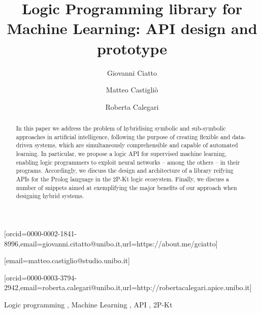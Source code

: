 \documentclass[
]{ceurart}
\begin{document}


\title{%
    Logic Programming library for Machine Learning: API design and prototype
}

\author[1]{Giovanni Ciatto}[orcid=0000-0002-1841-8996,email=giovanni.citatto@unibo.it,url=https://about.me/gciatto]
\author[3]{Matteo Castigliò}[email=matteo.castiglio@studio.unibo.it]
\author[2]{Roberta Calegari}[orcid=0000-0003-3794-2942,email=roberta.calegari@unibo.it,url=http://robertacalegari.apice.unibo.it]

\address[1]{Departement of Computer Science and Engineering (DISI), Alma Mater Studiorum---Università di Bologna}
\address[2]{Alma Mater Research Institute for Human Centered AI (AlmaAI), Alma Mater Studiorum---Università di Bologna}
\address[3]{Master Student at DISI}


\begin{abstract}
In this paper we address the problem of hybridising symbolic and sub-symbolic approaches in artificial intelligence, following the purpose of creating flexible and data-driven systems, which are simultaneously comprehensible and capable of automated learning.
%
In particular, we propose a logic API for supervised machine learning, enabling logic programmers to exploit neural networks -- among the others -- in their programs.
%
Accordingly, we discuss the design and architecture of a library reifying APIs for the Prolog language in the 2P-Kt logic ecosystem.
%
Finally, we discuss a number of snippets aimed at exemplifying the major benefits of our approach when designing hybrid systems.
\end{abstract}

\begin{keywords}
    Logic programming \sep
    Machine Learning \sep
    API \sep
    2P-Kt
\end{keywords}

\maketitle
\end{document}
